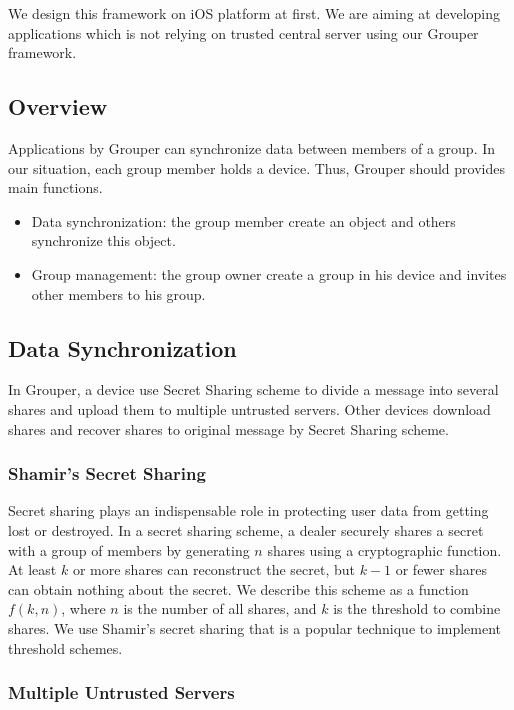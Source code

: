 \documentclass[twocolumn,10pt]{article}
\begin{document}
We design this framework on iOS platform at first. We are aiming at developing applications which is not relying on trusted central server using our Grouper framework. 

\subsection{Overview}
Applications by Grouper can synchronize data between members of a group. In our situation, each group member holds a device. Thus, Grouper should provides main functions.

\begin{itemize}
	\setlength{\itemsep}{1pt}
	\setlength{\parskip}{0pt}
	\setlength{\parsep}{0pt}
	\item Data synchronization: the group member create an object and others synchronize this object.
	\item Group management: the group owner create a group in his device and invites other members to his group.
\end{itemize}

\subsection{Data Synchronization}

In Grouper, a device use Secret Sharing scheme to divide a message into several shares and upload them to multiple untrusted servers. Other devices download shares and recover shares to original message by Secret Sharing scheme.

\subsubsection{Shamir's Secret Sharing}
Secret sharing plays an indispensable role in protecting user data from getting lost or destroyed. In a secret sharing scheme, a dealer securely shares a secret with a group of members by generating $n$ shares using a cryptographic function\cite{smith2013layered}. At least $k$ or more shares can reconstruct the secret, but $k-1$ or fewer shares can obtain nothing about the secret\cite{pang2005new}. We describe this scheme as a function $f(k, n)$, where $n$ is the number of all shares, and $k$ is the threshold to combine shares.  We use Shamir's secret sharing that  is a popular technique to implement threshold schemes.

\subsubsection{Multiple Untrusted Servers}
\end{document}
